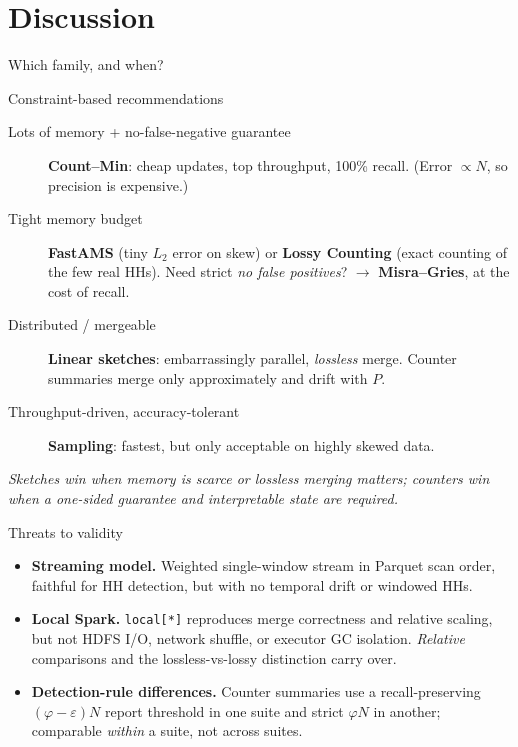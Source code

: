\documentclass[11pt,aspectratio=169]{beamer}
\begin{document}
\section{Discussion}

\begin{frame}{Which family, and when?}
  \begin{block}{Constraint-based recommendations}
    \begin{description}
      \item[\textcolor{sketchcol}{Lots of memory + no-false-negative guarantee}]
        \textbf{Count--Min}: cheap updates, top throughput, 100\% recall.
        (Error $\propto N$, so precision is expensive.)
      \item[Tight memory budget]
        \textbf{FastAMS} (tiny $L_2$ error on skew) or \textbf{Lossy Counting}
        (exact counting of the few real HHs). Need strict \emph{no false positives}?
        $\to$ \textbf{Misra--Gries}, at the cost of recall.
      \item[\textcolor{sketchcol}{Distributed / mergeable}]
        \textbf{Linear sketches}: embarrassingly parallel, \emph{lossless} merge.
        Counter summaries merge only approximately and drift with $P$.
      \item[Throughput-driven, accuracy-tolerant]
        \textbf{Sampling}: fastest, but only acceptable on highly skewed data.
    \end{description}
  \end{block}
  \centering\small
  \emph{Sketches win when memory is scarce or lossless merging matters;
  counters win when a one-sided guarantee and interpretable state are required.}
\end{frame}

\begin{frame}{Threats to validity}
  \begin{itemize}
    \item \textbf{Streaming model.} Weighted single-window stream in Parquet scan
          order, faithful for HH detection, but with no temporal drift or windowed HHs.
    \item \textbf{Local Spark.} \texttt{local[*]} reproduces merge correctness and
          relative scaling, but not HDFS I/O, network shuffle, or executor GC isolation.
          \emph{Relative} comparisons and the lossless-vs-lossy distinction carry over.
    \item \textbf{Detection-rule differences.} Counter summaries use a recall-preserving
          $(\varphi-\varepsilon)N$ report threshold in one suite and strict $\varphi N$ in
          another; comparable \emph{within} a suite, not across suites.
  \end{itemize}
\end{frame}
\end{document}
